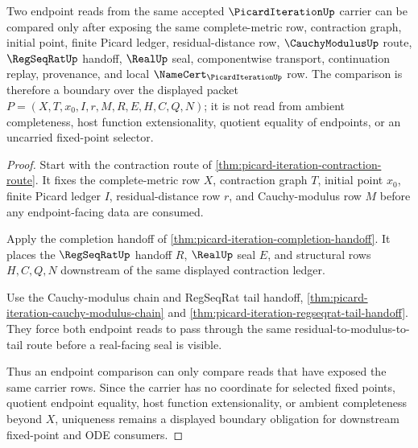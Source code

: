 \begin{theorem}
\label{thm:picard-iteration-endpoint-uniqueness-boundary}
Two endpoint reads from the same accepted $\PicardIterationUp$ carrier can be compared only after exposing the same complete-metric row, contraction graph, initial point, finite Picard ledger, residual-distance row, $\CauchyModulusUp$ route, $\RegSeqRatUp$ handoff, $\RealUp$ seal, componentwise transport, continuation replay, provenance, and local $\NameCert_{\PicardIterationUp}$ row. The comparison is therefore a boundary over the displayed packet $P=(X,T,x_0,I,r,M,R,E,H,C,Q,N)$; it is not read from ambient completeness, host function extensionality, quotient equality of endpoints, or an uncarried fixed-point selector.
\end{theorem}
\begin{proof}
Start with the contraction route of \autoref{thm:picard-iteration-contraction-route}. It fixes the complete-metric row $X$, contraction graph $T$, initial point $x_0$, finite Picard ledger $I$, residual-distance row $r$, and Cauchy-modulus row $M$ before any endpoint-facing data are consumed.

Apply the completion handoff of \autoref{thm:picard-iteration-completion-handoff}. It places the $\RegSeqRatUp$ handoff $R$, $\RealUp$ seal $E$, and structural rows $H,C,Q,N$ downstream of the same displayed contraction ledger.

Use the Cauchy-modulus chain and RegSeqRat tail handoff, \autoref{thm:picard-iteration-cauchy-modulus-chain} and \autoref{thm:picard-iteration-regseqrat-tail-handoff}. They force both endpoint reads to pass through the same residual-to-modulus-to-tail route before a real-facing seal is visible.

Thus an endpoint comparison can only compare reads that have exposed the same carrier rows. Since the carrier has no coordinate for selected fixed points, quotient endpoint equality, host function extensionality, or ambient completeness beyond $X$, uniqueness remains a displayed boundary obligation for downstream fixed-point and ODE consumers.
\end{proof}


